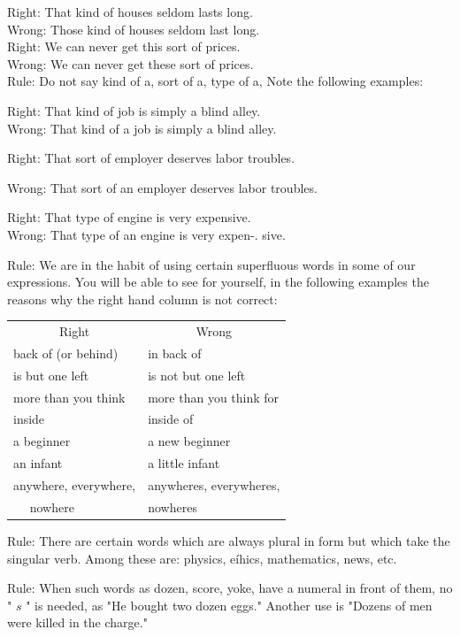 \documentclass[10pt]{article}
\begin{document}
Right: That kind of houses seldom lasts long.\\
Wrong: Those kind of houses seldom last long.\\
Right: We can never get this sort of prices.\\
Wrong: We can never get these sort of prices.\\
Rule: Do not say kind of a, sort of a, type of a, Note the following examples:

Right: That kind of job is simply a blind alley.\\
Wrong: That kind of a job is simply a blind alley.

Right: That sort of employer deserves labor troubles.

Wrong: That sort of an employer deserves labor troubles.

Right: That type of engine is very expensive.\\
Wrong: That type of an engine is very expen-. sive.

Rule: We are in the habit of using certain superfluous words in some of our expressions. You will be able to see for yourself, in the following examples the reasons why the right hand column is not correct:

\begin{center}
\begin{tabular}{ll}
\multicolumn{1}{c}{Right} & \multicolumn{1}{c}{Wrong} \\
back of (or behind) & in back of \\
is but one left & is not but one left \\
more than you think & more than you think for \\
inside & inside of \\
a beginner & a new beginner \\
an infant & a little infant \\
anywhere, everywhere, & anywheres, everywheres, \\
$\quad$ nowhere & nowheres \\
\end{tabular}
\end{center}

Rule: There are certain words which are always plural in form but which take the singular verb. Among these are: physics, eíhics, mathematics, news, etc.

Rule: When such words as dozen, score, yoke, have a numeral in front of them, no " $s$ " is needed, as "He bought two dozen eggs." Another use is "Dozens of men were killed in the charge."
\end{document}
